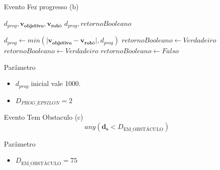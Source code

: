 \begin{frame}
	\begin{exampleblock}{Evento Fez progresso (b)}
		
		\begin{algorithm}[H]
		\scriptsize
		\caption{Verificação de progresso}
		\begin{algorithmic}[1]
	
		\REQUIRE $d_{prog}, \mathbf{v_{\text{objetivo}}}, \mathbf{v_{\text{robô}}}$
		\ENSURE $d_{prog}, retornoBooleano$
	
			\STATE $d_{prog} \leftarrow min(\mid \mathbf{v_{\text{objetivo}}} - \mathbf{v_{\text{robô}}} \mid, d_{prog})$
			\STATE $retornoBooleano \leftarrow Verdadeiro$
			\STATE $retornoBooleano \leftarrow Verdadeiro$
		\ELSE
			\STATE $retornoBooleano \leftarrow Falso$ 
		\ENDIF
	
		\end{algorithmic}
		\end{algorithm}
		
	\end{exampleblock}
	\pause
	\begin{block}{Parâmetro}
		\begin{itemize}
		  \item $d_{prog}$ inicial vale 1000.
		  \pause
		  \item $D_{PROG\_EPSILON} = 2$
		\end{itemize}
	\end{block}
\end{frame}

\begin{frame}
	\begin{block}{Evento Tem Obstaculo (c)}
		\begin{equation}
			any(\mathbf{d_s} < D_{\text{EM\_OBSTÁCULO}})
		\end{equation}		
	\end{block}
	\pause
	\begin{exampleblock}{Parâmetro}
		\begin{itemize}
		  \item $D_{\text{EM\_OBSTÁCULO}} = 75$
		\end{itemize}
	\end{exampleblock}
\end{frame}

